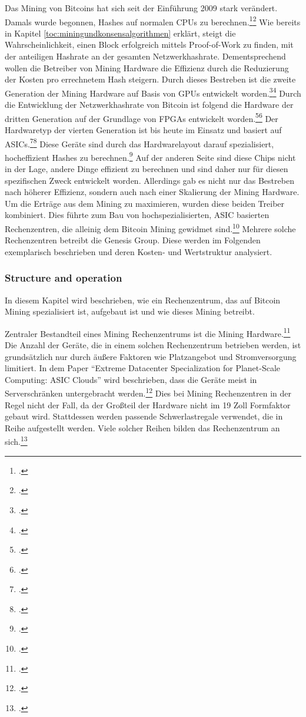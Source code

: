 Das Mining von Bitcoins hat sich seit der Einführung 2009 stark verändert. Damals wurde begonnen, Hashes auf
normalen \acp{CPU} zu berechnen.\footcite[Cf.][pp. 97]{xie2018extreme}\footcite[Cf.][p. 62]{taylor2017evolution}
Wie bereits in Kapitel \ref{toc:miningundkonsensalgorithmen} erklärt, steigt die Wahrscheinlichkeit, einen Block
erfolgreich mittels Proof-of-Work zu finden, mit der anteiligen Hashrate an der gesamten Netzwerkhashrate.
Dementsprechend wollen die Betreiber von Mining Hardware die Effizienz durch die Reduzierung der Kosten pro
errechnetem Hash steigern. Durch dieses Bestreben ist die zweite Generation der Mining Hardware auf Basis von
\acp{GPU} entwickelt worden.\footcite[Cf.][p. 98]{xie2018extreme}\footcite[Cf.][p. 62]{taylor2017evolution}
Durch die Entwicklung der Netzwerkhashrate von Bitcoin ist folgend die Hardware der dritten Generation auf der
Grundlage von \acp{FPGA} entwickelt worden.\footcite[Cf.][p. 98]{xie2018extreme}\footcite[Cf.][pp. 62]{taylor2017evolution}
Der Hardwaretyp der vierten Generation ist bis heute im Einsatz und basiert auf
\acp{ASIC}.\footcite[Cf.][pp. 98]{xie2018extreme}\footcite[Cf.][p. 15]{gai2020blockchain} Diese Geräte sind
durch das Hardwarelayout darauf spezialisiert, hocheffizient Hashes zu berechnen.\footcite[Cf.][p. 15]{gai2020blockchain}
Auf der anderen Seite sind diese Chips nicht in der Lage, andere Dinge effizient zu berechnen und sind daher nur für diesen
spezifischen Zweck entwickelt worden. Allerdings gab es nicht nur das Bestreben nach höherer Effizienz, sondern auch
nach einer Skalierung der Mining Hardware. Um die Erträge aus dem Mining zu maximieren, wurden diese beiden Treiber
kombiniert. Dies führte zum Bau von hochspezialisierten, ASIC basierten Rechenzentren, die alleinig dem Bitcoin Mining
gewidmet sind.\footcite[Cf.][p. 97]{xie2018extreme} Mehrere solche Rechenzentren betreibt die Genesis Group. Diese werden
im Folgenden exemplarisch beschrieben und deren Kosten- und Wertstruktur analysiert.

\subsubsection{Structure and operation} \label{toc:aufbauundfunktionsweise}

In diesem Kapitel wird beschrieben, wie ein Rechenzentrum, das auf Bitcoin Mining spezialisiert ist, aufgebaut ist
und wie dieses Mining betreibt.

Zentraler Bestandteil eines Mining Rechenzentrums ist die Mining Hardware.\footcite[Cf.][p. 327]{derks2018chaining}
Die Anzahl der Geräte, die in einem solchen Rechenzentrum betrieben werden, ist grundsätzlich nur durch äußere Faktoren
wie Platzangebot und Stromversorgung limitiert. In dem Paper "`Extreme Datacenter Specialization for Planet-Scale
Computing: ASIC Clouds"' wird beschrieben, dass die Geräte meist in Serverschränken untergebracht
werden.\footcite[Cf.][Fig. 5]{xie2018extreme} Dies bei Mining Rechenzentren in der Regel nicht der Fall,
da der Großteil der Hardware nicht im 19 Zoll Formfaktor gebaut wird. Stattdessen werden passende Schwerlastregale
verwendet, die in Reihe aufgestellt werden. Viele solcher Reihen bilden das Rechenzentrum an
sich.\footcite[Cf.][]{appendix:layoutkardok}

